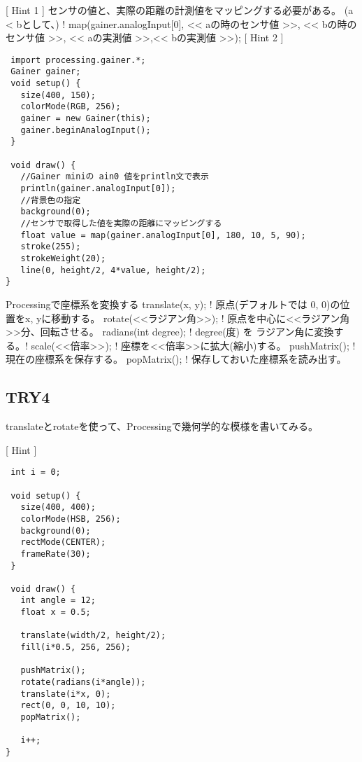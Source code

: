 \documentclass[11pt,a4paper]{jarticle}
\begin{document}
[ Hint 1 ]
 センサの値と、実際の距離の計測値をマッピングする必要がある。
(a < bとして、)
!
map(gainer.analogInput[0],
<< aの時のセンサ値 >>, << bの時のセンサ値 >>, << aの実測値 >>,<< bの実測値 >>);
[ Hint 2 ]

\begin{lstlisting}
 import processing.gainer.*;
 Gainer gainer;
 void setup() {
   size(400, 150);
   colorMode(RGB, 256);
   gainer = new Gainer(this);
   gainer.beginAnalogInput();
 }
 
 void draw() {
   //Gainer miniの ain0 値をprintln文で表示
   println(gainer.analogInput[0]);
   //背景色の指定
   background(0);
   //センサで取得した値を実際の距離にマッピングする
   float value = map(gainer.analogInput[0], 180, 10, 5, 90);
   stroke(255);
   strokeWeight(20);
   line(0, height/2, 4*value, height/2);
}
\end{lstlisting}


Processingで座標系を変換する
translate(x, y);
!
原点(デフォルトでは 0, 0)の位置をx, yに移動する。
rotate(<<ラジアン角>>);
!
原点を中心に<<ラジアン角>>分、回転させる。
radians(int degree);
!
degree(度) を ラジアン角に変換する。!
scale(<<倍率>>);
!
座標を<<倍率>>に拡大(縮小)する。
pushMatrix();
!
現在の座標系を保存する。
popMatrix();
!
保存しておいた座標系を読み出す。

\subsection*{TRY4}
translateとrotateを使って、Processingで幾何学的な模様を書いてみる。

[ Hint ]
\begin{lstlisting}
 int i = 0;
 
 void setup() {
   size(400, 400);
   colorMode(HSB, 256);
   background(0);
   rectMode(CENTER);
   frameRate(30);
 }
 
 void draw() {
   int angle = 12;
   float x = 0.5;

   translate(width/2, height/2);
   fill(i*0.5, 256, 256);

   pushMatrix();
   rotate(radians(i*angle));
   translate(i*x, 0);
   rect(0, 0, 10, 10);
   popMatrix();

   i++;
} 
\end{lstlisting}
\end{document}
